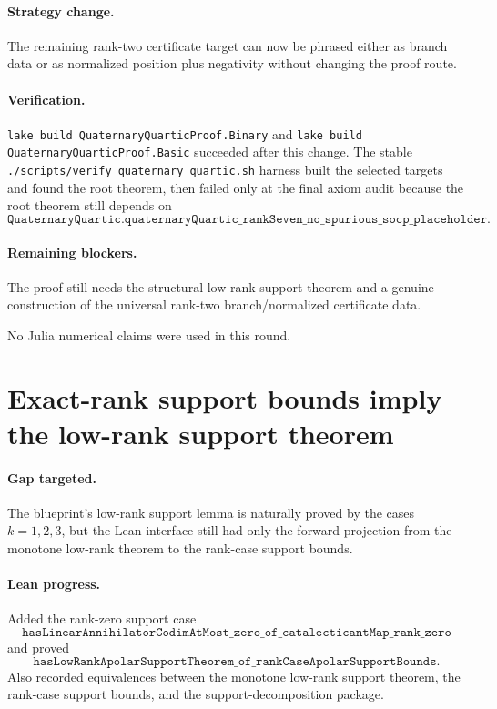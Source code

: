 \documentclass[11pt]{article}
\begin{document}
\paragraph{Strategy change.}
The remaining rank-two certificate target can now be phrased either as branch
data or as normalized position plus negativity without changing the proof route.

\paragraph{Verification.}
\texttt{lake build QuaternaryQuarticProof.Binary} and
\texttt{lake build QuaternaryQuarticProof.Basic} succeeded after this change.
The stable \texttt{./scripts/verify\_quaternary\_quartic.sh} harness built the
selected targets and found the root theorem, then failed only at the final axiom
audit because the root theorem still depends on
\[
\texttt{QuaternaryQuartic.quaternaryQuartic\_rankSeven\_no\_spurious\_socp\_placeholder}.
\]

\paragraph{Remaining blockers.}
The proof still needs the structural low-rank support theorem and a genuine
construction of the universal rank-two branch/normalized certificate data.

No Julia numerical claims were used in this round.

\section*{Exact-rank support bounds imply the low-rank support theorem}

\paragraph{Gap targeted.}
The blueprint's low-rank support lemma is naturally proved by the cases
\(k=1,2,3\), but the Lean interface still had only the forward projection from
the monotone low-rank theorem to the rank-case support bounds.

\paragraph{Lean progress.}
Added the rank-zero support case
\[
\texttt{hasLinearAnnihilatorCodimAtMost\_zero\_of\_catalecticantMap\_rank\_zero}
\]
and proved
\[
\texttt{hasLowRankApolarSupportTheorem\_of\_rankCaseApolarSupportBounds}.
\]
Also recorded equivalences between the monotone low-rank support theorem, the
rank-case support bounds, and the support-decomposition package.
\end{document}
